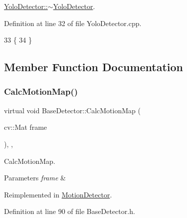 \mbox{\hyperlink{class_yolo_detector_a0ccb411c962a5ef58288f8dbc7a4b244}{Yolo\+Detector\+::$\sim$\+Yolo\+Detector}}. 



Definition at line 32 of file Yolo\+Detector.\+cpp.


\begin{DoxyCode}
33 \{
34 \}
\end{DoxyCode}


\subsection{Member Function Documentation}
\mbox{\label{class_base_detector_a73c66f0d4dad263fcf65c09a6f6feda2}} 
\subsubsection{\texorpdfstring{Calc\+Motion\+Map()}{CalcMotionMap()}}
{\footnotesize\ttfamily virtual void Base\+Detector\+::\+Calc\+Motion\+Map (\begin{DoxyParamCaption}\item[{cv\+::\+Mat}]{frame }\end{DoxyParamCaption})\hspace{0.3cm}{\ttfamily [inline]}, {\ttfamily [virtual]}, {\ttfamily [inherited]}}



Calc\+Motion\+Map. 


\begin{DoxyParams}{Parameters}
{\em frame} & \\
\hline
\end{DoxyParams}


Reimplemented in \mbox{\hyperlink{class_motion_detector_aa4e606acafdc33a3104471903e449adc}{Motion\+Detector}}.



Definition at line 90 of file Base\+Detector.\+h.


